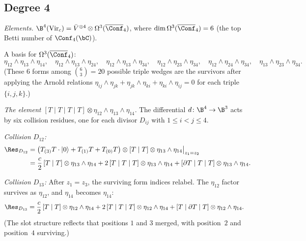 \subsection{Degree 4}

\begin{computation}
\label{comp:virasoro-deg4-full}

\emph{Elements.}
$\B^4(\mathrm{Vir}_c) = \bar{V}^{\otimes 4}
\otimes \Omega^3(\overline{\Conf}_4)$, where
$\dim \Omega^3(\overline{\Conf}_4) = 6$
(the top Betti number of $\Conf_4(\bC)$).

A basis for $\Omega^3(\overline{\Conf}_4)$:
\begin{equation}\label{eq:form-basis-4}
\eta_{12} \wedge \eta_{13} \wedge \eta_{14}, \quad
\eta_{12} \wedge \eta_{13} \wedge \eta_{24}, \quad
\eta_{12} \wedge \eta_{13} \wedge \eta_{34}, \quad
\eta_{12} \wedge \eta_{23} \wedge \eta_{34}, \quad
\eta_{12} \wedge \eta_{24} \wedge \eta_{34}, \quad
\eta_{13} \wedge \eta_{23} \wedge \eta_{34}.
\end{equation}
(These $6$ forms among $\binom{6}{3} = 20$ possible triple wedges
are the survivors after applying the Arnold relations
$\eta_{ij} \wedge \eta_{jk} + \eta_{jk} \wedge \eta_{ki}
+ \eta_{ki} \wedge \eta_{ij} = 0$ for each triple $\{i,j,k\}$.)

\emph{The element $[T\mid T\mid T\mid T]
\otimes \eta_{12} \wedge \eta_{13} \wedge \eta_{14}$.}
The differential $d\colon \B^4 \to \B^3$ acts by six collision
residues, one for each divisor $D_{ij}$ with $1 \leq i < j \leq 4$.

\emph{Collision $D_{12}$:}
\begin{align*}
\Res_{D_{12}} &= \bigl(T_{(3)}T \cdot |0\rangle + T_{(1)}T
  + T_{(0)}T\bigr) \otimes [T \mid T]
  \otimes \eta_{13} \wedge \eta_{14}\big|_{z_1 = z_2} \\
&= \frac{c}{2}\,[T \mid T] \otimes \eta_{13} \wedge \eta_{14}
  + 2\,[T \mid T \mid T] \otimes \eta_{13} \wedge \eta_{14}
  + [\partial T \mid T \mid T] \otimes \eta_{13} \wedge \eta_{14}.
\end{align*}

\emph{Collision $D_{13}$:}
After $z_1 = z_3$, the surviving form indices relabel.
The $\eta_{12}$ factor survives as $\eta_{12}$, and $\eta_{14}$
becomes $\eta_{14}$:
\begin{align*}
\Res_{D_{13}} &= \frac{c}{2}\,[T \mid T] \otimes \eta_{12} \wedge \eta_{14}
  + 2\,[T \mid T \mid T] \otimes \eta_{12} \wedge \eta_{14}
  + [T \mid \partial T \mid T] \otimes \eta_{12} \wedge \eta_{14}.
\end{align*}
(The slot structure reflects that positions $1$ and $3$ merged,
with position~$2$ and position~$4$ surviving.)


\end{computation}
